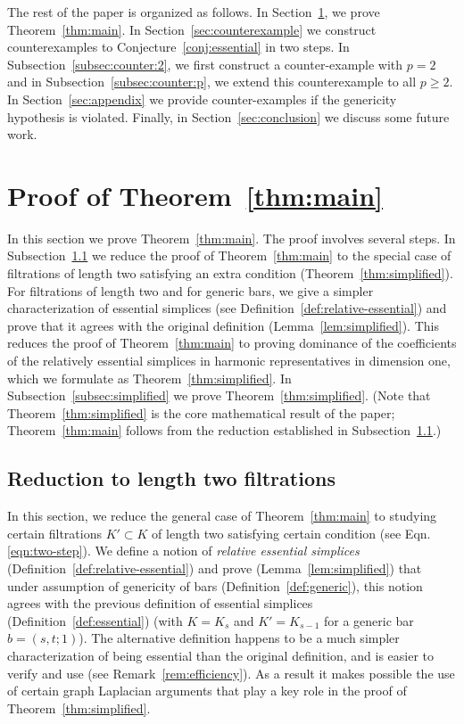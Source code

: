 \documentclass[11pt]{amsart}
\theoremstyle{theorem}
\theoremstyle{remark}
\theoremstyle{definition}
\begin{document}
\medskip
The rest of the paper is organized as follows. In Section~\ref{sec:main}, we prove Theorem~\ref{thm:main}. In Section~\ref{sec:counterexample} we construct counterexamples  to Conjecture~\ref{conj:essential} in two steps.
In Subsection~\ref{subsec:counter:2}, we first construct a counter-example with $p=2$ and in Subsection~\ref{subsec:counter:p}, we extend this counterexample to all $p \geq 2$. In Section~\ref{sec:appendix} we 
provide counter-examples if the genericity hypothesis is violated. Finally, in Section~\ref{sec:conclusion} we discuss some future work.

\section{Proof of Theorem~\ref{thm:main}}
\label{sec:main}
In this section we prove Theorem~\ref{thm:main}. The proof involves several steps. In Subsection~\ref{subsec:relative} we reduce the 
proof of Theorem~\ref{thm:main}
to the special case of filtrations of length two satisfying an extra condition (Theorem~\ref{thm:simplified}). 
For filtrations of length two and for generic bars, we give a simpler characterization of essential simplices (see Definition~\ref{def:relative-essential}) and prove that it agrees
with the original definition (Lemma~\ref{lem:simplified}). This reduces the proof of Theorem~\ref{thm:main} to proving dominance of the coefficients of
the relatively essential simplices in harmonic representatives in dimension one, which we formulate as Theorem~\ref{thm:simplified}.
In Subsection~\ref{subsec:simplified} we prove Theorem~\ref{thm:simplified}. 
(Note that Theorem~\ref{thm:simplified} is the core mathematical result of the paper; Theorem~\ref{thm:main} follows from the reduction established in Subsection~\ref{subsec:relative}.)

\subsection{Reduction to length two filtrations}
\label{subsec:relative}
In this section, we reduce the general case of Theorem~\ref{thm:main}
to studying certain filtrations $K' \subset K$ of length two satisfying 
certain condition (see Eqn. \eqref{eqn:two-step}). 
We define a notion of \emph{relative essential simplices} (Definition~\ref{def:relative-essential}) and prove (Lemma~\ref{lem:simplified}) that under assumption of genericity of bars (Definition~\ref{def:generic}), 
this notion agrees with the previous definition of essential simplices (Definition~\ref{def:essential}) (with $K=K_s$ and $K' = K_{s-1}$ for a generic bar $b = (s,t;1)$). 
The alternative definition happens to be a much simpler characterization of being essential than the original definition, and is easier to verify and use (see Remark~\ref{rem:efficiency}). 
As a result it makes possible the use of certain graph Laplacian arguments that play a key role in the proof of Theorem~\ref{thm:simplified}. 
\end{document}
